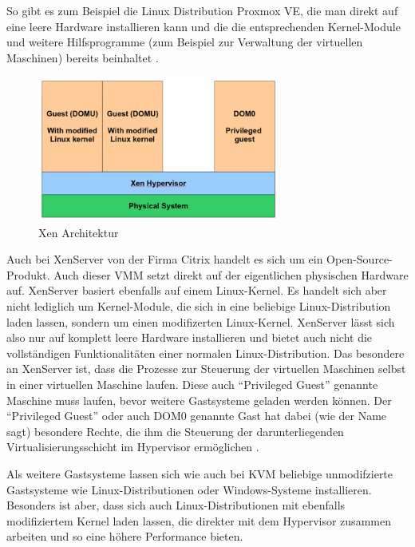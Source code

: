 So gibt es zum Beispiel die Linux Distribution Proxmox VE, die man direkt auf eine leere Hardware installieren kann und die die entsprechenden Kernel-Module und weitere Hilfsprogramme (zum Beispiel zur Verwaltung der virtuellen Maschinen) bereits beinhaltet \citep[Vgl.][]{Proxmox14}.

\begin{figure}[!ht]
  \begin{center}
    \includegraphics[width=8cm]{bilder/xen.png}
    \caption{Xen Architektur \citep{kvm:002}}
  \end{center}
\end{figure}

Auch bei XenServer von der Firma Citrix handelt es sich um ein Open-Source-Produkt. Auch dieser \ac{VMM} setzt direkt auf der eigentlichen physischen Hardware auf. XenServer basiert ebenfalls auf einem Linux-Kernel. Es handelt sich aber nicht lediglich um Kernel-Module, die sich in eine beliebige Linux-Distribution laden lassen, sondern um einen modifizerten Linux-Kernel. XenServer lässt sich also nur auf komplett leere Hardware installieren und bietet auch nicht die vollständigen Funktionalitäten einer normalen Linux-Distribution. Das besondere an XenServer ist, dass die Prozesse zur Steuerung der virtuellen Maschinen selbst in einer virtuellen Maschine laufen. Diese auch "`Privileged Guest"' genannte Maschine muss laufen, bevor weitere Gastsysteme geladen werden können. Der "`Privileged Guest"' oder auch DOM0 genannte Gast hat dabei (wie der Name sagt) besondere Rechte, die ihm die Steuerung der darunterliegenden Virtualisierungsschicht im Hypervisor ermöglichen \citep[Vgl.][S. 2]{Schee14}.

Als weitere Gastsysteme lassen sich wie auch bei KVM beliebige unmodifzierte Gastsysteme wie Linux-Distributionen oder Windows-Systeme installieren. Besonders ist aber, dass sich auch Linux-Distributionen mit ebenfalls modifiziertem Kernel laden lassen, die direkter mit dem Hypervisor zusammen arbeiten und so eine höhere Performance bieten.


